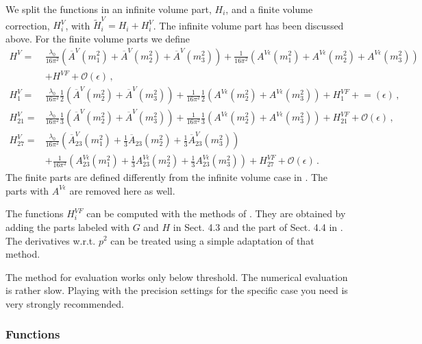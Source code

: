 \documentclass[12pt,a4paper]{article}
\begin{document}
We split the functions in an infinite volume part, $H_i$, and a finite
volume correction, $H^V_i$, with
$\tilde H^V_i= H_i+ H^V_i$. The infinite volume part has been
discussed above.
For the finite volume parts we define
\begin{align}
\label{defHVF}
H^V =& \frac{\lambda_0}{16\pi^2}
 \left(\overline A^V(m_1^2)+\overline A^V(m_2^2)+\overline A^V(m_3^2)\right)
 +\frac{1}{16\pi^2}
    \left(A^{V\epsilon}(m_1^2)+A^{V\epsilon}(m_2^2)+A^{V\epsilon}(m_3^2)\right)
\nonumber\\&
 +H^{VF}+\mathcal{O}(\epsilon)\,,
\nonumber\\
H^V_1 =& \frac{\lambda_0}{16\pi^2}\frac{1}{2}
 \left(\overline A^V(m_2^2)+\overline A^V(m_3^2)\right)
 +\frac{1}{16\pi^2}\frac{1}{2}
    \left(A^{V\epsilon}(m_2^2)+A^{V\epsilon}(m_3^2)\right)
 +H^{VF}_1+\mathcal{=}(\epsilon)\,,
\nonumber\\
H^V_{21} =& \frac{\lambda_0}{16\pi^2}\frac{1}{3}
 \left(\overline A^V(m_2^2)+\overline A^V(m_3^2)\right)
 +\frac{1}{16\pi^2}\frac{1}{3}
    \left(A^{V\epsilon}(m_2^2)+A^{V\epsilon}(m_3^2)\right)
 +H^{VF}_{21}+\mathcal{O}(\epsilon)\,,
\nonumber\\
 H^V_{27} =& \frac{\lambda_0}{16\pi^2}
 \left(\overline A^V_{23}(m_1^2)+\frac{1}{3}\overline A_{23}(m_2^2)+
       \frac{1}{3}\overline A^V_{23}(m_3^2)\right)
\nonumber\\&
 +\frac{1}{16\pi^2}
    \left(A^{V\epsilon}_{23}(m_1^2)
+\frac{1}{3}A^{V\epsilon}_{23}(m_2^2)
+\frac{1}{3}A^{V\epsilon}_{23}(m_3^2)\right)
 +H^{VF}_{27}+\mathcal{O}(\epsilon)\,.
\end{align}
The finite parts are defined differently from the
infinite volume case in \cite{Amoros:1999dp}.
The parts with $A^{V\epsilon}$ are removed here as well.

The functions $H^{VF}_i$ can be computed with the methods
of \cite{Bijnens:2013doa}.
They are obtained by adding the parts labeled with $G$ and $H$ in Sect. 4.3 and
the part of Sect. 4.4 in \cite{Bijnens:2013doa}.
The derivatives w.r.t. $p^2$ can be treated using a simple adaptation of that method.

The method for evaluation works only below threshold. The numerical evaluation
is rather slow. Playing with the precision settings for the specific case
you need is very strongly recommended.

\subsubsection{Functions}
\end{document}
